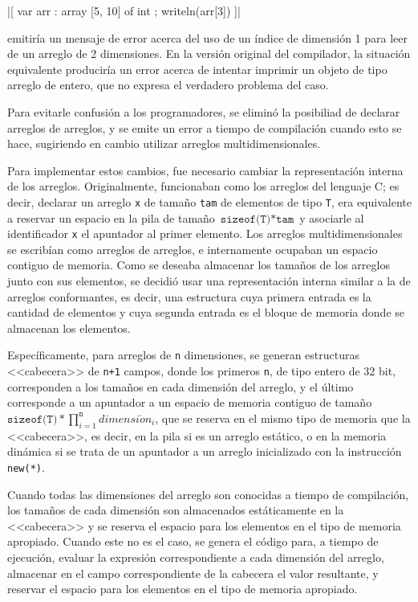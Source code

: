 \begin{gracielacode}
  |[ var arr : array [5, 10] of int
  ;  writeln(arr[3])
  ]|
\end{gracielacode}

emitiría un mensaje de error acerca del uso de un índice de dimensión 1 para
leer de un arreglo de 2 dimensiones. En la versión original del compilador, la
situación equivalente produciría un error acerca de intentar imprimir un objeto
de tipo arreglo de entero, que no expresa el verdadero problema del caso.

Para evitarle confusión a los programadores, se eliminó la posibiliad de
declarar arreglos de arreglos, y se emite un error a tiempo de compilación cuando esto se hace, 
sugiriendo en cambio utilizar arreglos multidimensionales.

Para implementar estos cambios, fue necesario cambiar la representación interna
de los arreglos. Originalmente, funcionaban como los arreglos del lenguaje C; es
decir, declarar un arreglo \texttt{x} de tamaño \texttt{tam} de elementos de
tipo \texttt{T}, era equivalente a reservar un espacio en la pila de tamaño
$\texttt{sizeof(T)} * \texttt{tam}$ y asociarle al identificador \texttt{x} el
apuntador al primer elemento. Los arreglos multidimensionales se escribían como
arreglos de arreglos, e internamente ocupaban un espacio contiguo de memoria.
Como se deseaba almacenar los tamaños de los arreglos junto con sus elementos,
se decidió usar una representación interna similar a la de arreglos
conformantes, es decir, una estructura cuya primera entrada es la cantidad de
elementos y cuya segunda entrada es el bloque de memoria donde se almacenan los
elementos.

Específicamente, para arreglos de \texttt{n} dimensiones, se generan estructuras
<<cabecera>> de \texttt{n+1} campos, donde los primeros \texttt{n}, de tipo
entero de 32 bit, corresponden a los tamaños en cada dimensión del arreglo, y el
último corresponde a un apuntador a un espacio de memoria contiguo de tamaño
$\texttt{sizeof(T)} * \prod\limits_{i=1}^\texttt{n} dimensi\acute{o}n_i$, que se
reserva en el mismo tipo de memoria que la <<cabecera>>, es decir, en la pila si
es un arreglo estático, o en la memoria dinámica si se trata de un apuntador a
un arreglo inicializado con la instrucción \texttt{new(*)}.

Cuando todas las dimensiones del arreglo son conocidas a tiempo de compilación,
los tamaños de cada dimensión son almacenados estáticamente en la <<cabecera>> y
se reserva el espacio para los elementos en el tipo de memoria apropiado. Cuando
este no es el caso, se genera el código para, a tiempo de ejecución, evaluar la
expresión correspondiente a cada dimensión del arreglo, almacenar en el campo
correspondiente de la cabecera el valor resultante, y reservar el espacio para
los elementos en el tipo de memoria apropiado.

